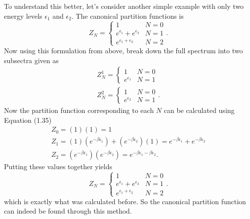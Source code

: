 To understand this better, let's consider another simple example with only two energy levels $\epsilon_1$ and $\epsilon_2$. The canonical partition functions is 
\begin{equation}
    Z_N = \begin{cases}
    1 & N=0\\
    e^{\epsilon_1}+e^{\epsilon_2} & N=1\\
    e^{\epsilon_1+\epsilon_2} & N=2
    \end{cases}.
\end{equation}
Now using this formulation from above, break down the full spectrum into two subsectra given as 
\begin{gather}
    Z_N^1=\begin{cases}1&N=0\\e^{\epsilon_1}& N=1\end{cases}\\
    Z_N^2=\begin{cases}1&N=0\\e^{\epsilon_2}& N=1\end{cases}.
\end{gather}
Now the partition function corresponding to each $N$ can be calculated using Equation (1.35)  
\begin{gather}
    Z_0= (1)(1)=1\\
    Z_1= (1)(e^{-\beta\epsilon_1})+(e^{-\beta\epsilon_2})(1)=e^{-\beta\epsilon_1}+e^{-\beta\epsilon_2}\\
    Z_2=(e^{-\beta\epsilon_1})(e^{-\beta\epsilon_2})=e^{-\beta\epsilon_1-\beta\epsilon_2}.
\end{gather}
Putting these values together yields 
\begin{equation}
    Z_N = \begin{cases}
    1 & N=0\\
    e^{\epsilon_1}+e^{\epsilon_2} & N=1\\
    e^{\epsilon_1+\epsilon_2} & N=2
    \end{cases}.
\end{equation}
which is exactly what was calculated before. So the canonical partition function can indeed be found through this method.